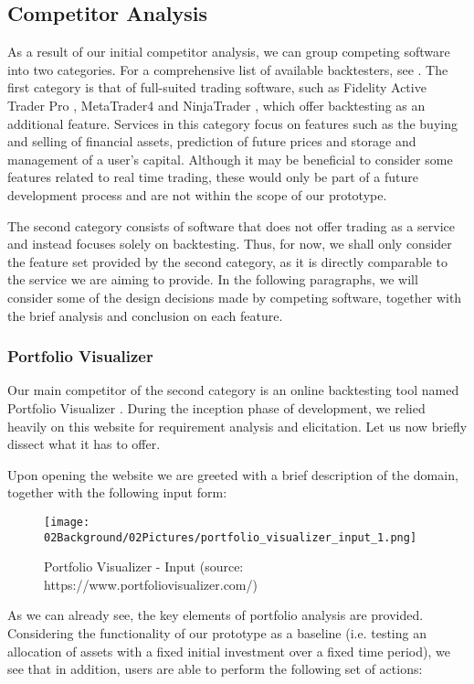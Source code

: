 \documentclass[main.tex]{subfiles}
\begin{document}
\subsection{Competitor Analysis}

As a result of our initial competitor analysis, we can group competing software into two categories. For a comprehensive list of available backtesters, see \cite{listofbacktesters}. The first category is that of full-suited trading software, such as Fidelity Active Trader Pro \cite{Fidelity}, MetaTrader4 \cite{MetaTrader} and NinjaTrader \cite{NinjaTrader}, which offer backtesting as an additional feature. Services in this category focus on features such as the buying and selling of financial assets, prediction of future prices and storage and management of a user's capital. Although it may be beneficial to consider some features related to real time trading, these would only be part of a future development process and are not within the scope of our prototype.

The second category consists of software that does not offer trading as a service and instead focuses solely on backtesting. Thus, for now, we shall only consider the feature set provided by the second category, as it is directly comparable to the service we are aiming to provide. In the following paragraphs, we will consider some of the design decisions made by competing software, together with the brief analysis and conclusion on each feature.

\subsubsection{Portfolio Visualizer}
Our main competitor of the second category is an online backtesting tool named Portfolio Visualizer \cite{portfoliovis}. During the inception phase of development, we relied heavily on this website for requirement analysis and elicitation. Let us now briefly dissect what it has to offer. 

Upon opening the website we are greeted with a brief description of the domain, together with the following input form:

\begin{figure}[H]
   \centering
   \texttt{[image: 02Background/02Pictures/portfolio\_visualizer\_input\_1.png]}
   \caption{Portfolio Visualizer - Input (source: https://www.portfoliovisualizer.com/)}
\end{figure}

As we can already see, the key elements of portfolio analysis are provided. Considering the functionality of our prototype as a baseline (i.e. testing an allocation of assets with a fixed initial investment over a fixed time period), we see that in addition, users are able to perform the following set of actions:
\end{document}
